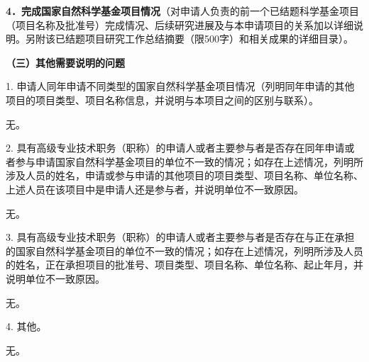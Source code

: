 \documentclass[14pt,a4paper]{extarticle}
\newcommand{\alert}[1]{\textcolor[rgb]{0.0625,0.4453,0.7383}{#1}}
\newcommand{\NsfcNote}[1]{\begin{spacing}{1.5} \alert{#1} \end{spacing}}
\newcommand{\NsfcSubNote}[1]{\alert{#1} \par}
\begin{document}
\NsfcSubNote{\textbf{4．完成国家自然科学基金项目情况}（对申请人负责的前一个已结题科学基金项目（项目名称及批准号）完成情况、后续研究进展及与本申请项目的关系加以详细说明。另附该已结题项目研究工作总结摘要（限500字）和相关成果的详细目录）。}



\NsfcNote{\textbf{（三）其他需要说明的问题}}
\NsfcSubNote{1. 申请人同年申请不同类型的国家自然科学基金项目情况（列明同年申请的其他项目的项目类型、项目名称信息，并说明与本项目之间的区别与联系）。}

无。

\NsfcSubNote{2. 具有高级专业技术职务（职称）的申请人或者主要参与者是否存在同年申请或者参与申请国家自然科学基金项目的单位不一致的情况；如存在上述情况，列明所涉及人员的姓名，申请或参与申请的其他项目的项目类型、项目名称、单位名称、上述人员在该项目中是申请人还是参与者，并说明单位不一致原因。}

无。

\NsfcSubNote{3. 具有高级专业技术职务（职称）的申请人或者主要参与者是否存在与正在承担的国家自然科学基金项目的单位不一致的情况；如存在上述情况，列明所涉及人员的姓名，正在承担项目的批准号、项目类型、项目名称、单位名称、起止年月，并说明单位不一致原因。}

无。

\NsfcSubNote{4. 其他。}

无。
\end{document}
